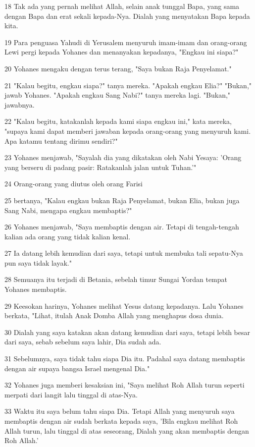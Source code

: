 \par 18 Tak ada yang pernah melihat Allah, selain anak tunggal Bapa, yang sama dengan Bapa dan erat sekali kepada-Nya. Dialah yang menyatakan Bapa kepada kita.
\par 19 Para penguasa Yahudi di Yerusalem menyuruh imam-imam dan orang-orang Lewi pergi kepada Yohanes dan menanyakan kepadanya, "Engkau ini siapa?"
\par 20 Yohanes mengaku dengan terus terang, "Saya bukan Raja Penyelamat."
\par 21 "Kalau begitu, engkau siapa?" tanya mereka. "Apakah engkau Elia?" "Bukan," jawab Yohanes. "Apakah engkau Sang Nabi?" tanya mereka lagi. "Bukan," jawabnya.
\par 22 "Kalau begitu, katakanlah kepada kami siapa engkau ini," kata mereka, "supaya kami dapat memberi jawaban kepada orang-orang yang menyuruh kami. Apa katamu tentang dirimu sendiri?"
\par 23 Yohanes menjawab, "Sayalah dia yang dikatakan oleh Nabi Yesaya: 'Orang yang berseru di padang pasir: Ratakanlah jalan untuk Tuhan.'"
\par 24 Orang-orang yang diutus oleh orang Farisi
\par 25 bertanya, "Kalau engkau bukan Raja Penyelamat, bukan Elia, bukan juga Sang Nabi, mengapa engkau membaptis?"
\par 26 Yohanes menjawab, "Saya membaptis dengan air. Tetapi di tengah-tengah kalian ada orang yang tidak kalian kenal.
\par 27 Ia datang lebih kemudian dari saya, tetapi untuk membuka tali sepatu-Nya pun saya tidak layak."
\par 28 Semuanya itu terjadi di Betania, sebelah timur Sungai Yordan tempat Yohanes membaptis.
\par 29 Keesokan harinya, Yohanes melihat Yesus datang kepadanya. Lalu Yohanes berkata, "Lihat, itulah Anak Domba Allah yang menghapus dosa dunia.
\par 30 Dialah yang saya katakan akan datang kemudian dari saya, tetapi lebih besar dari saya, sebab sebelum saya lahir, Dia sudah ada.
\par 31 Sebelumnya, saya tidak tahu siapa Dia itu. Padahal saya datang membaptis dengan air supaya bangsa Israel mengenal Dia."
\par 32 Yohanes juga memberi kesaksian ini, "Saya melihat Roh Allah turun seperti merpati dari langit lalu tinggal di atas-Nya.
\par 33 Waktu itu saya belum tahu siapa Dia. Tetapi Allah yang menyuruh saya membaptis dengan air sudah berkata kepada saya, 'Bila engkau melihat Roh Allah turun, lalu tinggal di atas seseorang, Dialah yang akan membaptis dengan Roh Allah.'
